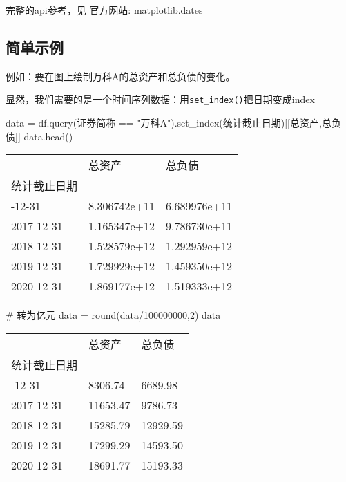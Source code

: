 \documentclass[
  letterpaper,
  DIV=11,
  numbers=noendperiod]{scrreprt}
\newenvironment{Shaded}{\begin{snugshade}}{\end{snugshade}}
\newcommand{\BuiltInTok}[1]{\textcolor[rgb]{0.00,0.23,0.31}{#1}}
\newcommand{\CommentTok}[1]{\textcolor[rgb]{0.37,0.37,0.37}{#1}}
\newcommand{\DecValTok}[1]{\textcolor[rgb]{0.68,0.00,0.00}{#1}}
\newcommand{\NormalTok}[1]{\textcolor[rgb]{0.00,0.23,0.31}{#1}}
\newcommand{\OperatorTok}[1]{\textcolor[rgb]{0.37,0.37,0.37}{#1}}
\newcommand{\StringTok}[1]{\textcolor[rgb]{0.13,0.47,0.30}{#1}}
\begin{document}
完整的api参考，见
\href{https://matplotlib.org/stable/api/dates_api.html}{官方网站:
matplotlib.dates}

\hypertarget{ux7b80ux5355ux793aux4f8b-1}{%
\subsection{简单示例}\label{ux7b80ux5355ux793aux4f8b-1}}

例如：要在图上绘制万科A的总资产和总负债的变化。

显然，我们需要的是一个时间序列数据：用\texttt{set\_index()}把日期变成index

\begin{Shaded}
\begin{Highlighting}[]
\NormalTok{data }\OperatorTok{=}\NormalTok{ df.query(}\StringTok{\textquotesingle{}证券简称 == "万科A"\textquotesingle{}}\NormalTok{).set\_index(}\StringTok{\textquotesingle{}统计截止日期\textquotesingle{}}\NormalTok{)[[}\StringTok{\textquotesingle{}总资产\textquotesingle{}}\NormalTok{,}\StringTok{\textquotesingle{}总负债\textquotesingle{}}\NormalTok{]]}
\NormalTok{data.head()}
\end{Highlighting}
\end{Shaded}

\begin{longtable}[]{@{}lll@{}}
\toprule\noalign{}
& 总资产 & 总负债 \\
统计截止日期 & & \\
\midrule\noalign{}
\endhead
\bottomrule\noalign{}
\endlastfoot
2016-12-31 & 8.306742e+11 & 6.689976e+11 \\
2017-12-31 & 1.165347e+12 & 9.786730e+11 \\
2018-12-31 & 1.528579e+12 & 1.292959e+12 \\
2019-12-31 & 1.729929e+12 & 1.459350e+12 \\
2020-12-31 & 1.869177e+12 & 1.519333e+12 \\
\end{longtable}

\begin{Shaded}
\begin{Highlighting}[]
\CommentTok{\# 转为亿元}
\NormalTok{data }\OperatorTok{=} \BuiltInTok{round}\NormalTok{(data}\OperatorTok{/}\DecValTok{100000000}\NormalTok{,}\DecValTok{2}\NormalTok{)}
\NormalTok{data}
\end{Highlighting}
\end{Shaded}

\begin{longtable}[]{@{}lll@{}}
\toprule\noalign{}
& 总资产 & 总负债 \\
统计截止日期 & & \\
\midrule\noalign{}
\endhead
\bottomrule\noalign{}
\endlastfoot
2016-12-31 & 8306.74 & 6689.98 \\
2017-12-31 & 11653.47 & 9786.73 \\
2018-12-31 & 15285.79 & 12929.59 \\
2019-12-31 & 17299.29 & 14593.50 \\
2020-12-31 & 18691.77 & 15193.33 \\
\end{longtable}
\end{document}
